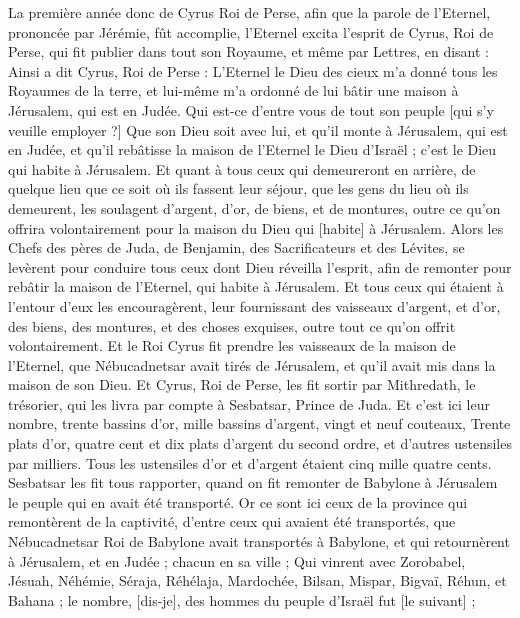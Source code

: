 \BFont
\begin{multicols}{2}
\VerseOne{}La première année donc de Cyrus Roi de Perse, afin que la parole de l'Eternel, prononcée par Jérémie, fût accomplie, l'Eternel excita l'esprit de Cyrus, Roi de Perse, qui fit publier dans tout son Royaume, et même par Lettres, en disant :
Ainsi a dit Cyrus, Roi de Perse : L'Eternel le Dieu des cieux m'a donné tous les Royaumes de la terre, et lui-même m'a ordonné de lui bâtir une maison à Jérusalem, qui est en Judée.
Qui est-ce d'entre vous de tout son peuple [qui s'y veuille employer ?] Que son Dieu soit avec lui, et qu'il monte à Jérusalem, qui est en Judée, et qu'il rebâtisse la maison de l'Eternel le Dieu d'Israël ; c'est le Dieu qui habite à Jérusalem.
Et quant à tous ceux qui demeureront en arrière, de quelque lieu que ce soit où ils fassent leur séjour, que les gens du lieu où ils demeurent, les soulagent d'argent, d'or, de biens, et de montures, outre ce qu'on offrira volontairement pour la maison du Dieu qui [habite] à Jérusalem.
Alors les Chefs des pères de Juda, de Benjamin, des Sacrificateurs et des Lévites, se levèrent pour conduire tous ceux dont Dieu réveilla l'esprit, afin de remonter pour rebâtir la maison de l'Eternel, qui habite à Jérusalem.
Et tous ceux qui étaient à l'entour d'eux les encouragèrent, leur fournissant des vaisseaux d'argent, et d'or, des biens, des montures, et des choses exquises, outre tout ce qu'on offrit volontairement.
Et le Roi Cyrus fit prendre les vaisseaux de la maison de l'Eternel, que Nébucadnetsar avait tirés de Jérusalem, et qu'il avait mis dans la maison de son Dieu.
Et Cyrus, Roi de Perse, les fit sortir par Mithredath, le trésorier, qui les livra par compte à Sesbatsar, Prince de Juda.
Et c'est ici leur nombre, trente bassins d'or, mille bassins d'argent, vingt et neuf couteaux,
Trente plats d'or, quatre cent et dix plats d'argent du second ordre, et d'autres ustensiles par milliers.
Tous les ustensiles d'or et d'argent étaient cinq mille quatre cents. Sesbatsar les fit tous rapporter, quand on fit remonter de Babylone à Jérusalem le peuple qui en avait été transporté.
\VerseOne{}Or ce sont ici ceux de la province qui remontèrent de la captivité, d'entre ceux qui avaient été transportés, que Nébucadnetsar Roi de Babylone avait transportés à Babylone, et qui retournèrent à Jérusalem, et en Judée ; chacun en sa ville ;
Qui vinrent avec Zorobabel, Jésuah, Néhémie, Séraja, Réhélaja, Mardochée, Bilsan, Mispar, Bigvaï, Réhun, et Bahana ; le nombre, [dis-je], des hommes du peuple d'Israël fut [le suivant] ;

\end{multicols}
